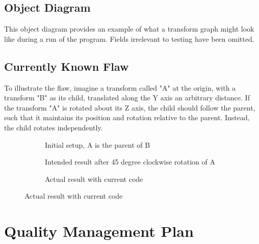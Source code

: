 \documentclass[11pt]{article}
\begin{document}
\subsection{Object Diagram}
\label{sec:orgd78c818}
This object diagram provides an example of what a transform graph might look like during a run of the program. Fields irrelevant to testing have been omitted.
\begin{center}

\label{org29378e7}
\end{center}
\newpage
\subsection{Currently Known Flaw}
\label{sec:org63931cb}

To illustrate the flaw, imagine a transform called "A" at the origin, with a transform "B" as its child, translated along the Y axis an arbitrary distance.  If the transform "A" is rotated about its Z axis, the child should follow the parent, such that it maintains its position and rotation relative to the parent. Instead, the child rotates independently.

\begin{figure}[htbp]
  \centering
  \begin{subfigure}{0.30\textwidth}
  \centering
  \caption{Initial setup, A is the parent of B}
  \end{subfigure}
  \hfill
  \begin{subfigure}{0.30\textwidth}
  \centering
  \caption{Intended result after 45 degree clockwise rotation of A}
  \end{subfigure}
  \hfill
    \begin{subfigure}{0.30\textwidth}
  \centering
  \caption{Actual result with current code}
  \end{subfigure}
\end{figure}
\section{Quality Management Plan}
\label{sec:orgf0617e0}
\end{document}
